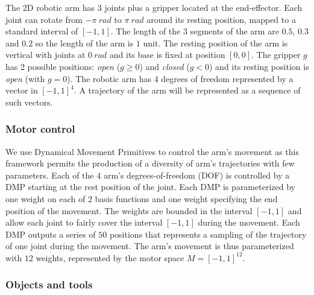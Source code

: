 \documentclass[10pt,letterpaper]{article}
\begin{document}
			The 2D robotic arm has $3$ joints plus a gripper located at the end-effector.
			Each joint can rotate from $-\pi~rad$ to $\pi~rad$ around its resting position, mapped to a standard interval of $[-1,1]$.
			The length of the $3$ segments of the arm are $0.5$, $0.3$ and $0.2$ so the length of the arm is $1$ unit.
			The resting position of the arm is vertical with joints at $0~rad$ and its base is fixed at position $[0, 0]$.
			The gripper $g$ has 2 possible positions: \textit{open} ($g \geq 0$) and \textit{closed} ($g < 0$) and its resting position is \textit{open} (with $g = 0$).
			The robotic arm has 4 degrees of freedom represented by a vector in $[-1,1]^4$.
			A trajectory of the arm will be represented as a sequence of such vectors.
		
		
		\subsubsection{Motor control}
		
			We use Dynamical Movement Primitives \cite{ijspeert_dynamical_2013} to control the arm's movement as this framework permits the production of a diversity of arm's trajectories with few parameters.
			Each of the $4$ arm's degrees-of-freedom (DOF) is controlled by a DMP starting at the rest position of the joint.
			Each DMP is parameterized by one weight on each of $2$ basis functions and one weight specifying the end position of the movement.
			The weights are bounded in the interval $[-1,1]$ and allow each joint to fairly cover the interval $[-1,1]$ during the movement.
			Each DMP outputs a series of $50$ positions that represents a sampling of the trajectory of one joint during the movement.		
			The arm's movement is thus parameterized with $12$ weights, represented by the motor space $M=[-1,1]^{12}$.
		
			
		\subsubsection{Objects and tools}
			
\end{document}
